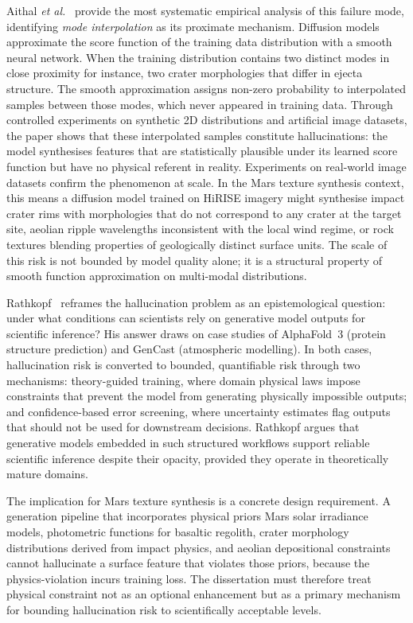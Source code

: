 \documentclass[10pt,journal]{IEEEtran}
\begin{document}
Aithal \textit{et al.}~\cite{aithal2024hallucination} provide the most
systematic empirical analysis of this failure mode, identifying \textit{mode
interpolation} as its proximate mechanism. Diffusion models approximate the score
function of the training data distribution with a smooth neural network. When the
training distribution contains two distinct modes in close proximity for instance,
two crater morphologies that differ in ejecta structure. The smooth approximation
assigns non-zero probability to interpolated samples between those modes, which
never appeared in training data. Through controlled experiments on synthetic 2D
distributions and artificial image datasets, the paper shows that these
interpolated samples constitute hallucinations: the model synthesises features
that are statistically plausible under its learned score function but have no
physical referent in reality. Experiments on real-world image datasets confirm
the phenomenon at scale. In the Mars texture synthesis context, this means a
diffusion model trained on HiRISE imagery might synthesise impact crater rims
with morphologies that do not correspond to any crater at the target site,
aeolian ripple wavelengths inconsistent with the local wind regime, or rock
textures blending properties of geologically distinct surface units. The scale
of this risk is not bounded by model quality alone; it is a structural property
of smooth function approximation on multi-modal distributions.

Rathkopf~\cite{rathkopf2025reliability} reframes the hallucination problem as
an epistemological question: under what conditions can scientists rely on
generative model outputs for scientific inference? His answer draws on case
studies of AlphaFold~3 (protein structure prediction) and GenCast (atmospheric
modelling). In both cases, hallucination risk is converted to bounded,
quantifiable risk through two mechanisms: theory-guided training, where domain
physical laws impose constraints that prevent the model from generating
physically impossible outputs; and confidence-based error screening, where
uncertainty estimates flag outputs that should not be used for downstream
decisions. Rathkopf argues that generative models embedded in such structured
workflows support reliable scientific inference despite their opacity, provided
they operate in theoretically mature domains.

The implication for Mars texture synthesis is a concrete design requirement.
A generation pipeline that incorporates physical priors Mars solar irradiance
models, photometric functions for basaltic regolith, crater morphology
distributions derived from impact physics, and aeolian depositional
constraints cannot hallucinate a surface feature that violates those priors,
because the physics-violation incurs training loss. The dissertation must
therefore treat physical constraint not as an optional enhancement but as a
primary mechanism for bounding hallucination risk to scientifically acceptable
levels.
\end{document}
